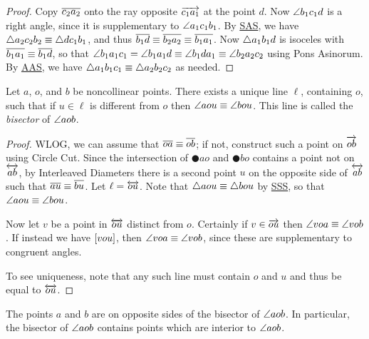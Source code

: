 \begin{proof}
Copy \(\overline{c_2a_2}\) onto the ray opposite \(\overrightarrow{c_1a_1}\) at the point \(d\).
Now \(\angle{b_1c_1d}\) is a right angle, since it is supplementary to \(\angle{a_1c_1b_1}\).
By \hyperref[prop:sas-theorem]{SAS}, we have \(\bigtriangleup{a_2c_2b_2} \equiv \bigtriangleup{dc_1b_1}\), and thus \(\overline{b_1d} \equiv \overline{b_2a_2} \equiv \overline{b_1a_1}\).
Now \(\bigtriangleup{a_1b_1d}\) is isoceles with \(\overline{b_1a_1} \equiv \overline{b_1d}\), so that \(\angle{b_1a_1c_1} = \angle{b_1a_1d} \equiv \angle{b_1da_1} \equiv \angle{b_2a_2c_2}\) using Pons Asinorum.
By \hyperref[prop:aas-theorem]{AAS}, we have \(\bigtriangleup{a_1b_1c_1} \equiv \bigtriangleup{a_2b_2c_2}\) as needed.
\end{proof}


\begin{construct}
Let \(a\), \(o\), and \(b\) be noncollinear points.
There exists a unique line \(\ell\), containing \(o\), such that if \(u \in \ell\) is different from \(o\) then \(\angle{aou} \equiv \angle{bou}\).
This line is called the \emph{bisector} of \(\angle{aob}\).
\end{construct}

\begin{proof}
WLOG, we can assume that \(\overline{oa} \equiv \overline{ob}\); if not, construct such a point on \(\overrightarrow{ob}\) using Circle Cut.
Since the intersection of \(\CIRCLE{a}{o}\) and \(\CIRCLE{b}{o}\) contains a point not on \(\overleftrightarrow{ab}\), by Interleaved Diameters there is a second point \(u\) on the opposite side of \(\overleftrightarrow{ab}\) such that \(\overline{au} \equiv \overline{bu}\).
Let \(\ell = \overleftrightarrow{ou}\).
Note that \(\bigtriangleup{aou} \equiv \bigtriangleup{bou}\) by \hyperref[prop:sss-theorem]{SSS}, so that \(\angle{aou} \equiv \angle{bou}\).

Now let \(v\) be a point in \(\overleftrightarrow{ou}\) distinct from \(o\).
Certainly if \(v \in \overrightarrow{ou}\) then \(\angle{voa} \equiv \angle{vob}\).
If instead we have \([ v o u ]\), then \(\angle{voa} \equiv \angle{vob}\), since these are supplementary to congruent angles.

To see uniqueness, note that any such line must contain \(o\) and \(u\) and thus be equal to \(\overleftrightarrow{ou}\).
\end{proof}

\begin{cor}
The points \(a\) and \(b\) are on opposite sides of the bisector of \(\angle{aob}\).
In particular, the bisector of \(\angle{aob}\) contains points which are interior to \(\angle{aob}\).
\end{cor}

